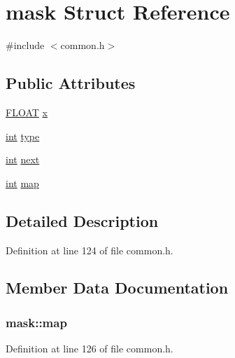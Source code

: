 \hypertarget{structmask}{}\section{mask Struct Reference}
\label{structmask}


{\ttfamily \#include $<$common.\+h$>$}

\subsection*{Public Attributes}
\begin{DoxyCompactItemize}
\item 
\hyperlink{twolame_2libtwolame_2common_8h_ae8690abbffa85934d64d545920e2b108}{F\+L\+O\+AT} \hyperlink{structmask_a9de036816c9a31cb8840c86c03e5304e}{x}
\item 
\hyperlink{xmltok_8h_a5a0d4a5641ce434f1d23533f2b2e6653}{int} \hyperlink{structmask_a83d6d319f1f4d045776dfdc4355282ac}{type}
\item 
\hyperlink{xmltok_8h_a5a0d4a5641ce434f1d23533f2b2e6653}{int} \hyperlink{structmask_a9b432c51c3485f1630fee3b8a37f2331}{next}
\item 
\hyperlink{xmltok_8h_a5a0d4a5641ce434f1d23533f2b2e6653}{int} \hyperlink{structmask_ada47aa1fcb5f533cb65a2180c5d75cb9}{map}
\end{DoxyCompactItemize}


\subsection{Detailed Description}


Definition at line 124 of file common.\+h.



\subsection{Member Data Documentation}
\subsubsection[{\texorpdfstring{map}{map}}]{ mask\+::map}\hypertarget{structmask_ada47aa1fcb5f533cb65a2180c5d75cb9}{}\label{structmask_ada47aa1fcb5f533cb65a2180c5d75cb9}


Definition at line 126 of file common.\+h.

